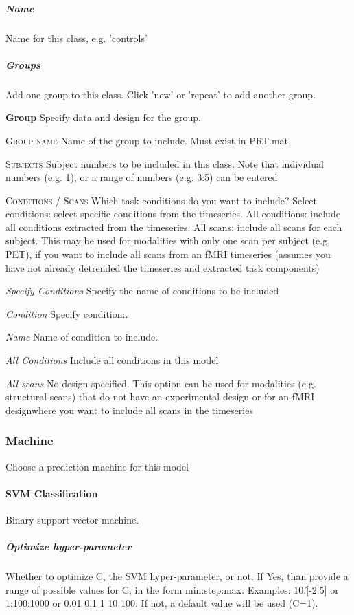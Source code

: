 \subparagraph{Name}
Name for this class, e.g. 'controls' 


\subparagraph{Groups}
Add one group to this class. Click 'new' or 'repeat' to add another group.


\textbf{Group}
Specify data and design for the group.


\textsc{Group name}
Name of the group to include. Must exist in PRT.mat


\textsc{Subjects}
Subject numbers to be included in this class. Note that individual numbers (e.g. 1), or a range of numbers (e.g. 3:5) can be entered


\textsc{Conditions / Scans}
Which task conditions do you want to include? Select conditions: select specific conditions from the timeseries. All conditions: include all conditions extracted from the timeseries. All scans: include all scans for each subject. This may be used for modalities with only one scan per subject (e.g. PET), if you want to include all scans from an fMRI timeseries (assumes you have not already detrended the timeseries and extracted task components)


\textsl{Specify Conditions}
Specify the name of conditions to be included 


\textit{Condition}
Specify condition:.


\textit{Name}
Name of condition to include.


\textsl{All Conditions}
Include all conditions in this model


\textsl{All scans}
No design specified. This option can be used for modalities (e.g. structural scans) that do not have an experimental design or for an fMRI designwhere you want to include all scans in the timeseries


\subsubsection{Machine}
Choose a prediction machine for this model


\paragraph{SVM Classification}
Binary support vector machine.


\subparagraph{Optimize hyper-parameter}
Whether to optimize C, the SVM hyper-parameter, or not. If Yes, than provide a range of possible values for C, in the form min:step:max. Examples: 10.\^[-2:5] or 1:100:1000 or 0.01 0.1 1 10 100. If not, a default value will be used (C=1).


